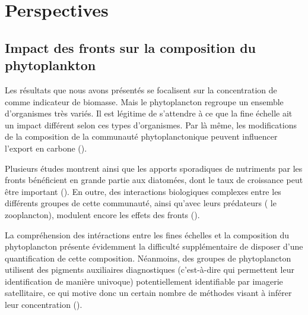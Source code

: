 
\chapter{Perspectives}
\addChpLof
\label{chp:perspectives}
\graphicspath{{resources/perspectives}}

{
  \hypersetup{hidelinks}
  \minitoc%
  \clearpage
}


\section{Impact des fronts sur la composition du phytoplankton}
\label{sec:persp-pft}


Les résultats que nous avons présentés se focalisent sur la concentration de  comme indicateur de biomasse.
Mais  le phytoplancton regroupe un ensemble d'organismes très variés.
Il est légitime de s'attendre à ce que la fine échelle ait un impact différent selon ces types d'organismes.
Par là même, les modifications de la composition de la communauté phytoplanctonique peuvent influencer l'export en carbone (\cite{treguer_2018,serra-pompei_2022}).

Plusieurs études montrent ainsi que les apports sporadiques de nutriments par les fronts bénéficient en grande partie aux diatomées, dont le taux de croissance peut être important (\cite{allen_2005,taylor_2012,treguer_2018,hernandez-carrasco_2020}).
En outre, des interactions biologiques complexes entre les différents groupes de cette communauté, ainsi qu'avec leurs prédateurs ( le zooplancton), modulent encore les effets des fronts (\cite{mangolte_2022}).

La compréhension des intéractions entre les fines échelles et la composition du phytoplancton présente évidemment la difficulté supplémentaire de disposer d'une quantification de cette composition.
Néanmoins, des groupes de phytoplancton utilisent des pigments auxiliaires diagnostiques (c'est-à-dire qui permettent leur identification de manière univoque) potentiellement identifiable par imagerie satellitaire, ce qui motive donc un certain nombre de méthodes visant à inférer leur concentration (\cite{uitz_2006,uitz_2010,uitz_2012,pan_2010,pan_2010,organelli_2013,chase_2013,chase_2017,bracher_2015a,xi_2020,xi_2021}).

